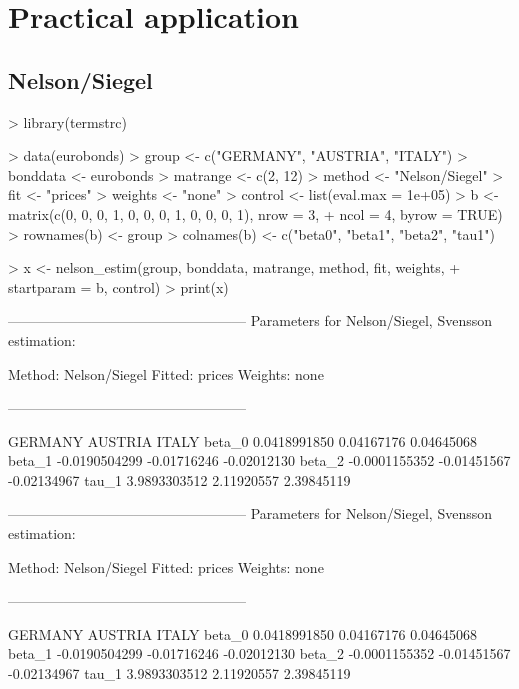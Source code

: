 \section{Practical application}
\label{sec:pract-appl}

\subsection{Nelson/Siegel}

\begin{Schunk}
\begin{Sinput}
> library(termstrc)
\end{Sinput}
\end{Schunk}

\begin{Schunk}
\begin{Sinput}
> data(eurobonds)
> group <- c("GERMANY", "AUSTRIA", "ITALY")
> bonddata <- eurobonds
> matrange <- c(2, 12)
> method <- "Nelson/Siegel"
> fit <- "prices"
> weights <- "none"
> control <- list(eval.max = 1e+05)
> b <- matrix(c(0, 0, 0, 1, 0, 0, 0, 1, 0, 0, 0, 1), nrow = 3, 
+     ncol = 4, byrow = TRUE)
> rownames(b) <- group
> colnames(b) <- c("beta0", "beta1", "beta2", "tau1")
\end{Sinput}
\end{Schunk}

\begin{Schunk}
\begin{Sinput}
> x <- nelson_estim(group, bonddata, matrange, method, fit, weights, 
+     startparam = b, control)
> print(x)
\end{Sinput}
\begin{Soutput}
---------------------------------------------------
Parameters for Nelson/Siegel, Svensson estimation:

Method: Nelson/Siegel 
Fitted: prices 
Weights: none 

---------------------------------------------------

             GERMANY     AUSTRIA       ITALY
beta_0  0.0418991850  0.04167176  0.04645068
beta_1 -0.0190504299 -0.01716246 -0.02012130
beta_2 -0.0001155352 -0.01451567 -0.02134967
tau_1   3.9893303512  2.11920557  2.39845119

---------------------------------------------------
Parameters for Nelson/Siegel, Svensson estimation:

Method: Nelson/Siegel 
Fitted: prices 
Weights: none 

---------------------------------------------------

             GERMANY     AUSTRIA       ITALY
beta_0  0.0418991850  0.04167176  0.04645068
beta_1 -0.0190504299 -0.01716246 -0.02012130
beta_2 -0.0001155352 -0.01451567 -0.02134967
tau_1   3.9893303512  2.11920557  2.39845119
\end{Soutput}
\end{Schunk}

